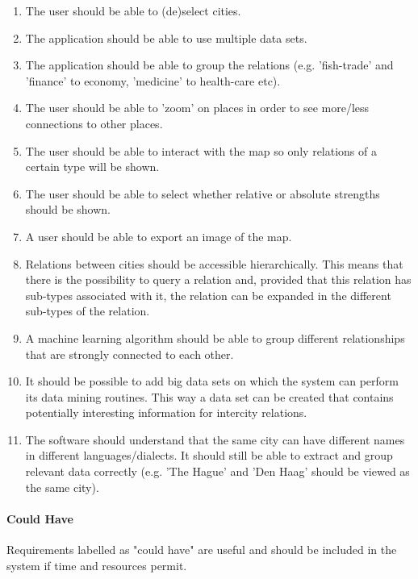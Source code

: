 \begin{enumerate}
    \item The user should be able to (de)select cities.
    \item The application should be able to use multiple data sets.
    \item The application should be able to group the relations (e.g. 'fish-trade' and 'finance' to economy, 'medicine' to health-care etc).
    \item The user should be able to 'zoom' on places in order to see more/less connections to other places.
    \item The user should be able to interact with the map so only relations of a certain type will be shown.
    \item The user should be able to select whether relative or absolute strengths should be shown.
    \item A user should be able to export an image of the map.
    \item Relations between cities should be accessible hierarchically. This means that there is the possibility to query a relation and, provided that this relation has sub-types associated with it, the relation can be expanded in the different sub-types of the relation.
    \item A machine learning algorithm should be able to group different relationships that are strongly connected to each other.
    \item It should be possible to add big data sets on which the system can perform its data mining routines. This way a data set can be created that contains potentially interesting information for intercity relations.
    \item The software should understand that the same city can have different names in different languages/dialects. It should still be able to extract and group relevant data correctly (e.g. 'The Hague' and 'Den Haag' should be viewed as the same city).
\end{enumerate}
\fi
\paragraph{Could Have}
Requirements labelled as "could have" are useful and should be included in the system if time and resources permit.

